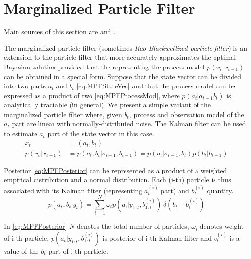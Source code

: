 \section{Marginalized Particle Filter}

Main sources of this section are \cite{SchGusNor:05} and \cite{SchKarGus:06}.

The marginalized particle filter (sometimes \emph{Rao-Blackwellized particle filter}) is an
extension to the particle filter that more accurately approximates the optimal Bayesian solution
provided that the {\pdf} representing the process model \(p(x_t|x_{t-1})\) can be obtained in
a special form. Suppose that the state vector can be divided into two parts \(a_t\) and \(b_t\)
\eqref{eq:MPFStateVec} and that the process model {\pdf} can be expressed as a product of two
{\pdfs} \eqref{eq:MPFProcessMod}, where \(p(a_t|a_{t-1} b_t)\) is analytically tractable (in general).
We present a simple variant of the marginalized particle filter where, given \(b_t\), process and
observation model of the \(a_t\) part are linear with normally-distributed noise. The Kalman filter
can be used to estimate \(a_t\) part of the state vector in this case.
\begin{align}
	x_t &= (a_t, b_t) \label{eq:MPFStateVec} \\
	p(x_t|x_{t-1}) &= p(a_t, b_t|a_{t-1}, b_{t-1}) = p(a_t|a_{t-1}, b_t) p(b_t | b_{t-1}) \label{eq:MPFProcessMod}
\end{align}

Posterior {\pdf} \eqref{eq:MPFPosterior} can be represented as a product of a weighted empirical
distribution and a normal distribution. Each (i-th) particle is thus associated with its Kalman filter
(representing \(a_t^{(i)}\) part) and \(b_t^{(i)}\) quantity.
\begin{equation} \label{eq:MPFPosterior}
	p(a_t, b_t | y_t) = \sum_{i=1}^N \omega_i p(a_t|y_{1:t},b_{1:t}^{(i)}) \; \delta(b_t - b_t^{(i)})
\end{equation}

In \eqref{eq:MPFPosterior} \(N\) denotes the total number of particles, \(\omega_i\) denotes weight
of i-th particle, \(p(a_t|y_{1:t},b_{1:t}^{(i)})\) is posterior {\pdf} of i-th Kalman
filter and \(b_t^{(i)}\) is a value of the \(b_t\) part of i-th particle.

